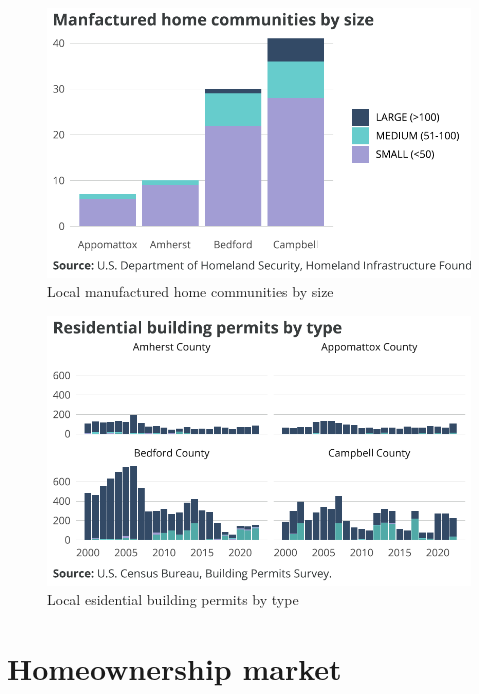 \documentclass[
  letterpaper,
  DIV=11,
  numbers=noendperiod]{scrreprt}
\begin{document}
\begin{figure}[H]

{\centering \includegraphics{./part-3-2_files/figure-pdf/fig-mhc-county-1.pdf}

}

\caption{\label{fig-mhc-county}Local manufactured home communities by
size}

\end{figure}

\begin{figure}[H]

{\centering \includegraphics{./part-3-2_files/figure-pdf/fig-localbps-1.pdf}

}

\caption{\label{fig-localbps}Local esidential building permits by type}

\end{figure}

\hypertarget{homeownership-market-1}{%
\section{Homeownership market}\label{homeownership-market-1}}
\end{document}
